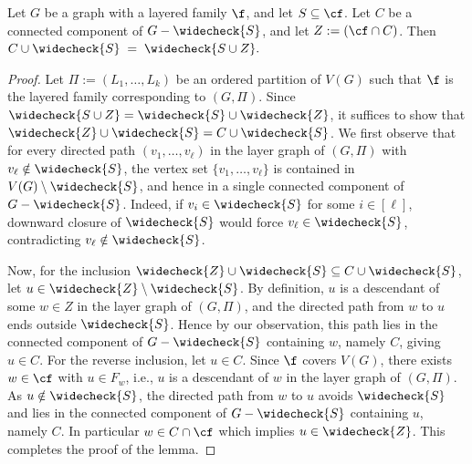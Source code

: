 \begin{lemma}\label{lem:component_is_downward_closure}
    Let $G$ be a graph with a layered family $\f$, and let $S \subseteq \cf$. Let $C$ be a connected component of $G - \widecheck{S}$, and let $Z := (\cf \cap C)$. Then $C \cup \widecheck{S} \;=\; \widecheck{S\cup Z}.$
\end{lemma}
\begin{proof}
    Let $\Pi := (L_1,\dots,L_k)$ be an ordered partition of $V(G)$ such that $\f$ is the layered family corresponding to $(G,\Pi)$. Since $\widecheck{S \cup Z} = \widecheck{S} \cup \widecheck{Z}$, it suffices to show that $\widecheck{Z} \cup \widecheck{S} = C \cup \widecheck{S}$. We first observe that for every directed path $(v_1, \dots, v_\ell)$ in the layer graph of $(G,\Pi)$ with $v_\ell \notin \widecheck{S}$, the vertex set $\{v_1, \dots, v_\ell\}$ is contained in $V(G) \setminus \widecheck{S}$, and hence in a single connected component of $G - \widecheck{S}$. Indeed, if $v_i \in \widecheck{S}$ for some $i\in [\ell]$, downward closure of $\widecheck{S}$ would force $v_\ell \in \widecheck{S}$, contradicting $v_\ell \notin \widecheck{S}$.
    
    Now, for the inclusion $\widecheck{Z} \cup \widecheck{S} \subseteq C \cup \widecheck{S}$, let $u \in \widecheck{Z} \setminus \widecheck{S}$. By definition, $u$ is a descendant of some $w \in Z$ in the layer graph of $(G,\Pi)$, and the directed path from $w$ to $u$ ends outside $\widecheck{S}$. Hence by our observation, this path lies in the connected component of $G - \widecheck{S}$ containing $w$, namely $C$, giving $u \in C$.
    For the reverse inclusion, let $u \in C$. Since $\f$ covers $V(G)$, there exists $w \in \cf$ with $u \in F_w$, i.e., $u$ is a descendant of $w$ in the layer graph of $(G,\Pi)$. As $u \notin \widecheck{S}$, the directed path from $w$ to $u$ avoids $\widecheck{S}$ and lies in the connected component of $G - \widecheck{S}$ containing $u$, namely $C$. In particular $w \in C \cap \cf$ which implies $u \in \widecheck{Z}$. This completes the proof of the lemma.
\end{proof}

